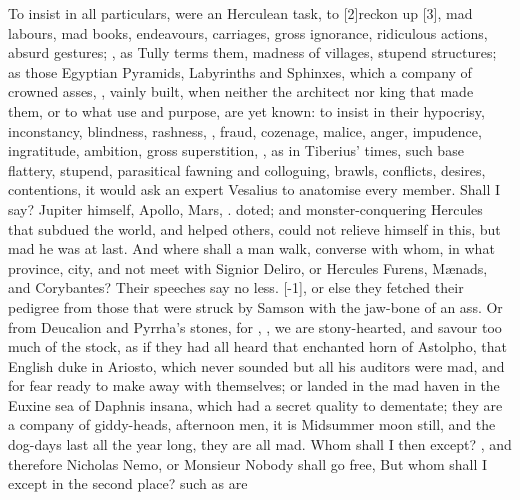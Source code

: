 To insist in all particulars, were an Herculean task, to
[2\baselineskip]reckon up [3\baselineskip], mad labours, mad books, endeavours, carriages, gross ignorance,
ridiculous actions, absurd gestures; , as Tully terms them, madness of villages, stupend
structures; as those Egyptian Pyramids, Labyrinths and Sphinxes, which
a company of crowned asses, , vainly built, when
neither the architect nor king that made them, or to what use and
purpose, are yet known: to insist in their hypocrisy, inconstancy,
blindness, rashness, , fraud, cozenage, malice,
anger, impudence, ingratitude, ambition, gross superstition,
, as in Tiberius' times, such
base flattery, stupend, parasitical fawning and colloguing, \etc{} brawls,
conflicts, desires, contentions, it would ask an expert Vesalius to
anatomise every member. Shall I say? Jupiter himself, Apollo, Mars, \etc.
doted; and monster-conquering Hercules that subdued the world, and
helped others, could not relieve himself in this, but mad he was at
last. And where shall a man walk, converse with whom, in what province,
city, and not meet with Signior Deliro, or Hercules Furens, M\ae{}nads,
and Corybantes? Their speeches say no less. [-1\baselineskip],
or else they fetched their pedigree from those that were struck by
Samson with the jaw-bone of an ass. Or from Deucalion and Pyrrha's
stones, for ,  , we are
stony-hearted, and savour too much of the stock, as if they had all
heard that enchanted horn of Astolpho, that English duke in Ariosto,
which never sounded but all his auditors were mad, and for fear ready
to make away with themselves; or landed in the mad haven in the
Euxine sea of Daphnis insana, which had a secret quality to dementate;
they are a company of giddy-heads, afternoon men, it is Midsummer moon
still, and the dog-days last all the year long, they are all mad. Whom
shall I then except?   , \etc{} and therefore Nicholas Nemo,
or Monsieur Nobody shall go free,  But whom shall I except in the second place? such as are
